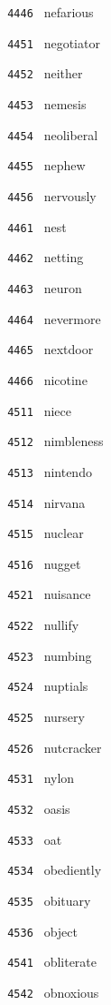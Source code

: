 \documentclass[11pt]{article}
\begin{document}
\begin{multicols}{6}
\noindent \texttt{ 4446 } nefarious  \par
\noindent \texttt{ 4451 } negotiator  \par
\noindent \texttt{ 4452 } neither  \par
\noindent \texttt{ 4453 } nemesis  \par
\noindent \texttt{ 4454 } neoliberal  \par
\noindent \texttt{ 4455 } nephew  \par
\noindent \texttt{ 4456 } nervously  \par
\noindent \texttt{ 4461 } nest  \par
\noindent \texttt{ 4462 } netting  \par
\noindent \texttt{ 4463 } neuron  \par
\noindent \texttt{ 4464 } nevermore  \par
\noindent \texttt{ 4465 } nextdoor  \par
\noindent \texttt{ 4466 } nicotine  \par
\noindent \texttt{ 4511 } niece  \par
\noindent \texttt{ 4512 } nimbleness  \par
\noindent \texttt{ 4513 } nintendo  \par
\noindent \texttt{ 4514 } nirvana  \par
\noindent \texttt{ 4515 } nuclear  \par
\noindent \texttt{ 4516 } nugget  \par
\noindent \texttt{ 4521 } nuisance  \par
\noindent \texttt{ 4522 } nullify  \par
\noindent \texttt{ 4523 } numbing  \par
\noindent \texttt{ 4524 } nuptials  \par
\noindent \texttt{ 4525 } nursery  \par
\noindent \texttt{ 4526 } nutcracker  \par
\noindent \texttt{ 4531 } nylon  \par
\noindent \texttt{ 4532 } oasis  \par
\noindent \texttt{ 4533 } oat  \par
\noindent \texttt{ 4534 } obediently  \par
\noindent \texttt{ 4535 } obituary  \par
\noindent \texttt{ 4536 } object  \par
\noindent \texttt{ 4541 } obliterate  \par
\noindent \texttt{ 4542 } obnoxious  \par

\end{multicols}
\end{document}

